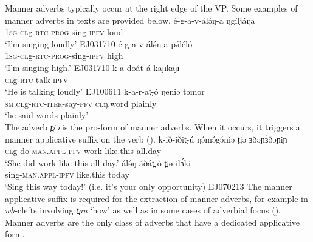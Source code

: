 
Manner adverbs typically occur at the right edge of the VP. Some examples of manner adverbs in texts are provided below.
\ea \gll é-g-a-v-álə́ŋ-a ŋgíljáŋa\\
\textsc{1sg}-\textsc{cl}g-\textsc{rtc}-\textsc{prog}-sing-\textsc{ipfv} loud\\
 \glt `I'm singing loudly'	\hfill	EJ031710
\ex \gll é-g-a-v-álə́ŋ-a pə́léló	\\
\textsc{1sg}-\textsc{cl}g-\textsc{rtc}-\textsc{prog}-sing-\textsc{ipfv} high\\
\glt	`I'm singing high.' \hfill	EJ031710
\ex \gll k-a-doát-á kaɲkaɲ	\\
\textsc{cl}g-\textsc{rtc}-talk-\textsc{ipfv}\\
\glt `He is talking loudly' \hfill	EJ100611
\ex
\gll k-a-r-at̪-ó 	ŋeniə	təmor\\
\textsc{sm.cl}g-\textsc{rtc-iter}-say-\textsc{pfv}  	\textsc{cl}ŋ.word   plainly\\
\glt ‘he said words plainly’\\
\z 
The adverb \textit{t̪iə} is the pro-form of manner adverbs. When it occurs, it triggers a manner applicative suffix on the verb (). 
\ea
\gll k-ið-iðit̪-ú 	ŋə́mə́gə́niə 	t̪iə 	ɜðəɲɜ́ðəɲiɲ\\
\textsc{cl}g-do-\textsc{man.appl-pfv}  	work 	like.this 	all.day  	\\
\glt ‘She did work like this all day.’
\ex
\gll álə́ŋ-áðát̪-ó 	t̪iə 	ilɜ́ki\\
sing-\textsc{man.appl-ipfv}	like.this 	today	\\
\glt ‘Sing this way today!’ (i.e. it’s your only opportunity) 		\hfill		EJ070213
\z
The manner applicative suffix is required for the extraction of manner adverbs, for example in \textit{wh}-clefts involving \textit{t̪au} `how' as well as in some cases of adverbial focus (). Manner adverbs are the only class of adverbs that have a dedicated applicative form.




